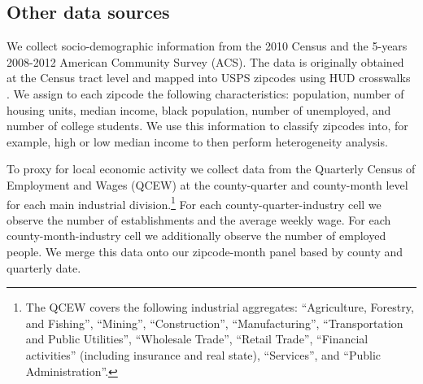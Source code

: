 \subsection{Other data sources}\label{sec:data/other_data}

We collect socio-demographic information from the 2010 Census and the 5-years 2008-2012 
American Community Survey (ACS). The data is originally obtained at the Census tract 
level and mapped into USPS zipcodes using HUD crosswalks \parencite{hudCrosswalks}. We 
assign to each zipcode the following characteristics: population, number of housing units, 
median income, black population, number of unemployed, and number of college students. We 
use this information to classify zipcodes into, for example, high or low median income to 
then perform heterogeneity analysis.

To proxy for local economic activity we collect data from the Quarterly Census of 
Employment and Wages (QCEW) at the county-quarter and county-month level for each main 
industrial division.\footnote{The QCEW covers the following industrial aggregates: 
	``Agriculture, Forestry, and Fishing'', ``Mining'', ``Construction'', ``Manufacturing'', 
	``Transportation and Public Utilities'', ``Wholesale Trade'', ``Retail Trade'',
	``Financial activities'' (including insurance and real state), ``Services'', and 
	``Public Administration''.}
For each county-quarter-industry cell we observe the number of establishments and the 
average weekly wage. For each county-month-industry cell we additionally observe the number 
of employed people. We merge this data onto our zipcode-month panel based by county and 
quarterly date.


